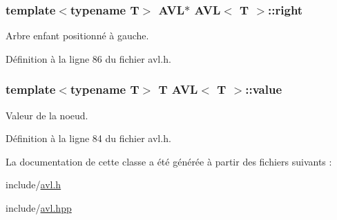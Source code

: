\hypertarget{class_a_v_l_ac02dee89f769588763a80be6176af37b}{
\subsubsection[{right}]{\setlength{\rightskip}{0pt plus 5cm}template$<$typename T$>$ {\bf A\-V\-L}$\ast$ {\bf A\-V\-L}$<$ T $>$\-::right}}\label{class_a_v_l_ac02dee89f769588763a80be6176af37b}


Arbre enfant positionné à gauche. 



Définition à la ligne 86 du fichier avl.\-h.

\hypertarget{class_a_v_l_a3f5c40790a92e0ebd93a187812d6b698}{
\subsubsection[{value}]{\setlength{\rightskip}{0pt plus 5cm}template$<$typename T$>$ T {\bf A\-V\-L}$<$ T $>$\-::value}}\label{class_a_v_l_a3f5c40790a92e0ebd93a187812d6b698}


Valeur de la noeud. 



Définition à la ligne 84 du fichier avl.\-h.



La documentation de cette classe a été générée à partir des fichiers suivants \-:\begin{DoxyCompactItemize}
\item 
include/\hyperlink{avl_8h}{avl.\-h}\item 
include/\hyperlink{avl_8hpp}{avl.\-hpp}\end{DoxyCompactItemize}
